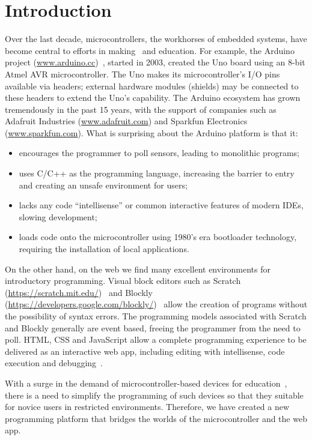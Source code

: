 \section{Introduction}
\label{sec:intro}

Over the last decade, microcontrollers, the workhorses of embedded systems, have become
central to efforts in making~\cite{dougherty2012maker} and education. For example, the Arduino project
(\url{www.arduino.cc})~\cite{buildingArduino2014},
started in 2003, created the Uno board using an 8-bit Atmel
AVR microcontroller. The Uno makes its microcontroller's I/O pins available via headers;
external hardware modules (shields) may be connected to these headers to extend
the Uno's capability. The Arduino ecosystem has grown tremendously in the past 15 years,
with the support of companies such as Adafruit Industries (\url{www.adafruit.com}) and
Sparkfun Electronics (\url{www.sparkfun.com}). What is surprising about the Arduino platform is that
it:
\begin{itemize}
\item encourages the programmer to poll sensors, leading to monolithic programs;
\item uses C/C++ as the programming language, increasing the barrier to entry and creating an unsafe environment for users;
\item lacks any code ``intellisense'' or common interactive features of modern IDEs, slowing development;
\item loads code onto the microcontroller using 1980's era bootloader technology, requiring the installation of local applications.
\end{itemize}
On the other hand, on the web we find many excellent environments for introductory programming.
Visual block editors such as Scratch (\url{https://scratch.mit.edu/})~\cite{ScratchCACM2009,BlocksBeyondCACM2017}
and Blockly (\url{https://developers.google.com/blockly/})~\cite{Blocky2015}
allow the creation of programs without the possibility of syntax errors.
The programming models associated with Scratch and Blockly generally are
event based, freeing the programmer from the need to poll.
HTML, CSS and JavaScript allow a complete programming experience to be delivered as an interactive
web app, including editing with intellisense, code execution and debugging~\cite{Monaco}. 

With a surge in the demand of microcontroller-based devices for education~\cite{XYZ}, 
there is a need to simplify the programming of such devices so that they suitable 
for novice users in restricted environments.
Therefore, we have created a new programming platform that bridges the worlds of 
the microcontroller and the web app. 

